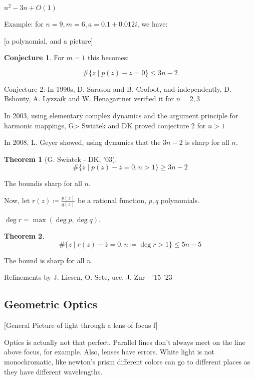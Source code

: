 \documentclass{article}
\theoremstyle{definition}
\newtheorem{theorem}{Theorem}
\newtheorem{conjecture}{Conjecture}
\begin{document}
\(n^2 -3n + O(1)\) 

Example: for \(n = 9, m = 6, a = 0.1 + 0.012i\), we have:

[a polynomial, and a picture]

\begin{conjecture}
    For \(m = 1\) this becomes:

    \[
        \#\{ z \mid  p(z) - \overline{z} = 0 \} \leq 3n - 2
    \]
\end{conjecture}

Conjecture 2: In 1990s, D. Sarason and B. Crofoot, and independently, D. Bshouty, A. Lyzzaik and W. Henagartner verified it for \(n = 2,3\) 

In 2003, using elementary complex dynamics and the argument principle for harmonic mappings, G> Swiatek and DK proved conjecture 2 for \(n > 1\) 

In 2008, L. Geyer showed, using dynamics that the \(3n - 2\) is sharp for all \(n\).

\begin{theorem}
    [G. Swiatek - DK, '03]

    \[
        \#\{ z \mid p(z) - \overline{z} = 0, n > 1 \} \geq 3n-2
    \]

    The boundis sharp for all \(n\).
\end{theorem}

Now, let \(r(z) \coloneqq \frac{p(z)}{q(z)}\) be a rational function, \(p,q\) polynomials.

\(\deg r = \max(\deg p, \deg q)\).  

\begin{theorem}
    \[
        \#\{ z \mid r(z) - \overline{z} = 0, n \coloneqq \deg r > 1 \} \leq 5n - 5
    \]

    The bound is sharp for all \(n\).
\end{theorem}

Refinements by J. Liesen, O. Sete, uce, J. Zur - '15-'23

\subsection*{Geometric Optics}

[General Picture of light through a lens of focus f]

Optics is actually not that perfect. Parallel lines don't always meet on the line above focus, for example. Also, lenses have errors. White light is not monochromatic, like newton's prism different colors can go to different places as they have different wavelengths.
\end{document}
